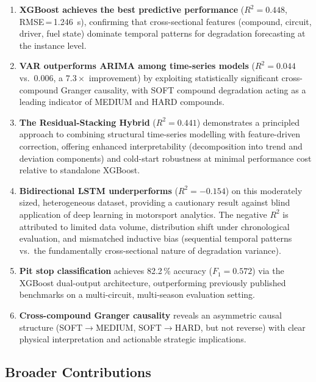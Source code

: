 \documentclass[journal,twoside]{IEEEtran}
\begin{document}
\begin{enumerate}
  \item \textbf{XGBoost achieves the best predictive performance}
  ($R^{2}=0.448$, RMSE\,=\,\SI{1.246}{\second}), confirming that
  cross-sectional features (compound, circuit, driver, fuel state)
  dominate temporal patterns for degradation forecasting at the
  instance level.

  \item \textbf{VAR outperforms ARIMA among time-series models}
  ($R^{2}=0.044$ vs.\ $0.006$, a $7.3\times$ improvement) by
  exploiting statistically significant cross-compound Granger
  causality, with SOFT compound degradation acting as a leading
  indicator of MEDIUM and HARD compounds.

  \item \textbf{The Residual-Stacking Hybrid} ($R^{2}=0.441$)
  demonstrates a principled approach to combining structural
  time-series modelling with feature-driven correction, offering
  enhanced interpretability (decomposition into trend and deviation
  components) and cold-start robustness at minimal performance cost
  relative to standalone XGBoost.

  \item \textbf{Bidirectional LSTM underperforms} ($R^{2}=-0.154$)
  on this moderately sized, heterogeneous dataset, providing a
  cautionary result against blind application of deep learning in
  motorsport analytics.  The negative $R^{2}$ is attributed to
  limited data volume, distribution shift under chronological
  evaluation, and mismatched inductive bias (sequential temporal
  patterns vs.\ the fundamentally cross-sectional nature of
  degradation variance).

  \item \textbf{Pit stop classification} achieves 82.2\,\% accuracy
  ($F_{1}=0.572$) via the XGBoost dual-output architecture, outperforming
  previously published benchmarks on a multi-circuit, multi-season
  evaluation setting.

  \item \textbf{Cross-compound Granger causality} reveals an
  asymmetric causal structure (SOFT$\rightarrow$MEDIUM,
  SOFT$\rightarrow$HARD, but not reverse) with clear physical
  interpretation and actionable strategic implications.
\end{enumerate}

\subsection{Broader Contributions}
\end{document}

